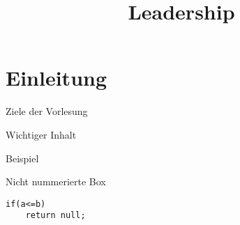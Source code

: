 \documentclass{cheatsheet}
\title{Leadership}
\begin{document}
    \section{Einleitung}
    \begin{sectionbox}{Ziele der Vorlesung}
        \begin{warningbox}{Wichtiger Inhalt}
        \end{warningbox}
        \begin{hintbox}{Beispiel}
        \end{hintbox}
    \end{sectionbox}
    \begin{normbox}{Nicht nummerierte Box}
        \begin{verbatim}
if(a<=b)
    return null;
        \end{verbatim}
    \end{normbox}
\end{document}
